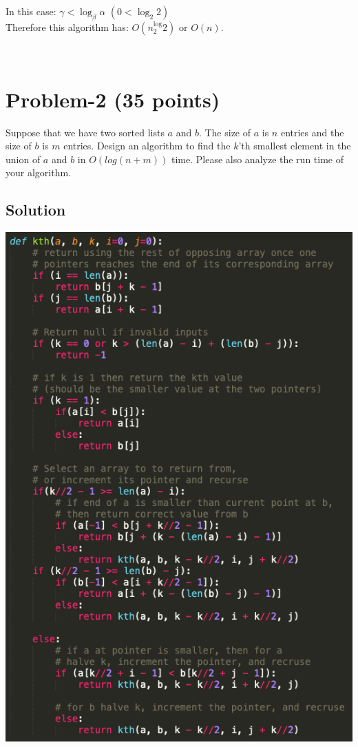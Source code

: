 \documentclass[11pt]{article}
\begin{document}
\noindent In this case: $\gamma < \log_\beta \alpha$ $(0 < \log_2 2)$\\
Therefore this algorithm has: $O(n^\log_2 2)$ or $O(n)$.



​
\newpage
\section*{Problem-2 (35 points)}
\noindent
Suppose that we have two sorted lists $a$ and $b$. The size of $a$ is $n$ entries and the size of $b$ is $m$ entries. Design an algorithm to find the $k$’th smallest element in the union of $a$ and $b$ in $O(log(n+m))$ time. Please also analyze the run time of your algorithm.


\subsection*{Solution}
\includegraphics[scale=0.5]{kth.png}
\end{document}
